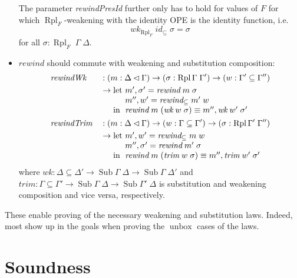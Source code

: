 \documentclass[12pt,twoside,openright]{report}
\numberwithin{equation}{chapter}
\numberwithin{figure}{chapter}
\numberwithin{table}{chapter}
\theoremstyle{definition}\newtheorem{definition}{Definition}
\DeclareMathOperator\unbox{unbox}
\begin{document}
\begin{itemize}
  The parameter \textit{rewindPresId} further only has to hold for values of $F$ for which
  $\operatorname{Rpl}_F$-weakening with the identity OPE is the identity function, i.e.
  $$ \textit{wk}_{\operatorname{Rpl}_F} \; \textit{id}_\subseteq \; \sigma = \sigma $$
  for all $\sigma : \operatorname{Rpl}_F \; \Gamma \; \Delta$.
\item $\textit{rewind}$ should commute with weakening and substitution composition:
  \begin{align*}
    &\textit{rewindWk} &&: (m : \Delta\lhd\Gamma) \to (\sigma : \operatorname{Rpl} \Gamma \; \Gamma') \to (w : \Gamma' \subseteq \Gamma'') \\
    &&&\to
    \begin{array}[t]{@{}l@{}l@{}}
      \text{let } & m' , \sigma' = \textit{rewind} \; m \; \sigma \\
      & m'' , w' = \textit{rewind}_\subseteq \; m' \; w \\
      \text{in } & \textit{rewind} \; m \; (\textit{wk} \; w \; \sigma) \equiv m'' , \textit{wk} \; w' \; \sigma'
    \end{array} \\
    &\textit{rewindTrim} &&: (m : \Delta\lhd\Gamma) \to (w : \Gamma \subseteq \Gamma') \to (\sigma : \operatorname{Rpl} \Gamma' \; \Gamma'') \\
    &&&\to
    \begin{array}[t]{@{}l@{}l@{}}
      \text{let } & m' , w' = \textit{rewind}_\subseteq \; m \; w \\
      & m'' , \sigma' = \textit{rewind} \; m' \; \sigma \\
      \text{in } & \textit{rewind} \; m \; (\textit{trim} \; w \; \sigma) \equiv m'' , \textit{trim} \; w' \; \sigma'
    \end{array}
  \end{align*}
  where $\textit{wk} : \Delta\subseteq\Delta' \to \operatorname{Sub} \Gamma \; \Delta \to \operatorname{Sub} \Gamma \; \Delta'$ and
  $\textit{trim} : \Gamma\subseteq\Gamma' \to \operatorname{Sub} \Gamma \; \Delta \to \operatorname{Sub} \Gamma' \; \Delta$
  is substitution and weakening composition and vice versa, respectively.
\end{itemize}
These enable proving of the necessary weakening and substitution laws.
Indeed, most show up in the goals when proving the $\unbox$ cases of the laws.

\section{Soundness}
\end{document}
